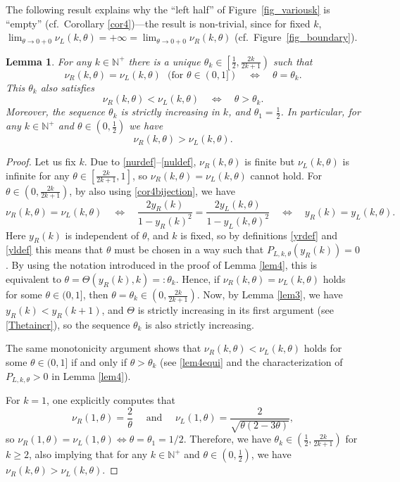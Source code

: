 \documentclass[a4paper]{article}
\newtheorem{lemma}{Lemma}
\newcommand{\te}{\theta}
\newcommand{\nul}{\nu_L(k,\theta)}
\newcommand{\nur}{\nu_R(k,\theta)}
\newcommand{\yl}{y_L(k,\theta)}
\newcommand{\yr}{y_R(k)}
\newcommand{\nplus}{\mathbb{N}^+}
\begin{document}
The following result explains why the ``left half'' of Figure~\ref{fig_variousk} is ``empty'' (cf.~Corollary \ref{cor4})---the result is non-trivial, since for fixed $k$, $\lim_{\te\to 0+0} \nul=+\infty=\lim_{\te\to 0+0} \nur$ (cf.~Figure~\ref{fig_boundary}).
\begin{lemma}\label{lem5} For any $k\in\nplus$ there is a unique $\te_k\in\left[\frac{1}{2},\frac{2k}{2k+1}\right)$  such that 
\[
\nur = \nul\ \ \  (\text{for } \te\in(0,1])\quad \Longleftrightarrow \quad \te= \te_k.
\]
This $\te_k$ also satisfies
\[
\nur < \nul\quad \Longleftrightarrow \quad \te> \te_k.
\]
Moreover, the sequence $\te_k$ is strictly increasing in $k$, and  $\te_1=\frac{1}{2}$. In particular, for any $k\in\nplus$ and $\te\in\left(0,\frac{1}{2}\right)$ we have 
\[
 \nur>\nul.
\] 
\end{lemma}
\begin{proof} Let us fix $k$. Due to \eqref{nurdef}--\eqref{nuldef}, $\nur$ is finite but $\nul$ is infinite for any $\te\in\left[\frac{2k}{2k+1},1\right]$, so $\nur = \nul$ cannot hold. For $\te\in\left(0,\frac{2k}{2k+1}\right)$, by also using \eqref{cor4bijection}, we have 
\[
\nur = \nul\quad \Longleftrightarrow \quad \frac{2\yr}{1-\yr^2}=\frac{2\yl}{1-\yl^2} \quad \Longleftrightarrow
\quad \yr=\yl.
\]
Here $\yr$ is independent of $\te$, and $k$ is fixed, so by definitions \eqref{yrdef} and \eqref{yldef} this means that $\te$ must be chosen in a way such that $P_{L,k,\te}(\yr)=0$. By using the notation introduced in the proof of Lemma \ref{lem4}, this is equivalent to $\te=\Theta(\yr,k)=:\te_k$. Hence, if $\nur = \nul$ holds for some $\te\in(0,1]$, then $\te=\te_k\in\left(0,\frac{2k}{2k+1}\right)$. Now, by Lemma \ref{lem3}, we have $\yr<y_R(k+1)$, and $\Theta$ is strictly increasing in its first argument (see \eqref{Thetaincr}), so the sequence $\te_k$ is also strictly increasing. 

The same monotonicity argument shows that $\nur < \nul$ holds for some $\te\in(0,1]$ if and only if $\te>\te_k$
(see \eqref{lem4equi} and the characterization of  $P_{L,k,\te}>0$ in Lemma \ref{lem4}). 

For $k=1$, one explicitly computes that
\begin{equation}\label{nurl1thetaconcrete}
\nu_R(1,\theta)=\frac{2}{\te}\quad\text{ and }\quad\nu_L(1,\theta)=\frac{2}{\sqrt{\theta  (2-3 \theta)}},
\end{equation}
so $\nu_R(1,\theta)=\nu_L(1,\theta) \Longleftrightarrow \te=\te_1=1/2$. Therefore, we have
$\te_k\in\left(\frac{1}{2},\frac{2k}{2k+1}\right)$ for $k\ge 2$, also implying that for any $k\in\nplus$ and 
$\te\in\left(0,\frac{1}{2}\right)$, we have $\nur>\nul$.
\end{proof}
\end{document}
